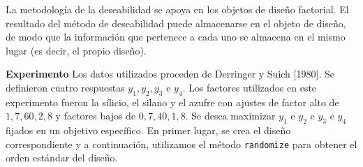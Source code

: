 \documentclass[
]{book}
\begin{document}
La metodología de la deseabilidad se apoya en los objetos de diseño factorial. El resultado
del método de deseabilidad puede almacenarse en el objeto de diseño, de modo que la información que
pertenece a cada uno se almacena en el mismo lugar (es decir, el propio diseño).

\textbf{Experimento}
Los datos utilizados proceden de Derringer y Suich {[}1980{]}. Se definieron cuatro respuestas \(y_1, y_2, y_3\) e \(y_4\).
Los factores utilizados en este experimento fueron la sílicio, el silano y el azufre con ajustes de factor alto de \(1,7, 60, 2,8\) y factores bajos de \(0,7, 40, 1,8\). Se desea maximizar \(y_1\) e \(y_2\)
e \(y_3\) e \(y_4\) fijados en un objetivo específico.
En primer lugar, se crea el diseño correspondiente y a continuación, utilizamos el método \texttt{randomize} para obtener el orden estándar del diseño.
\end{document}
